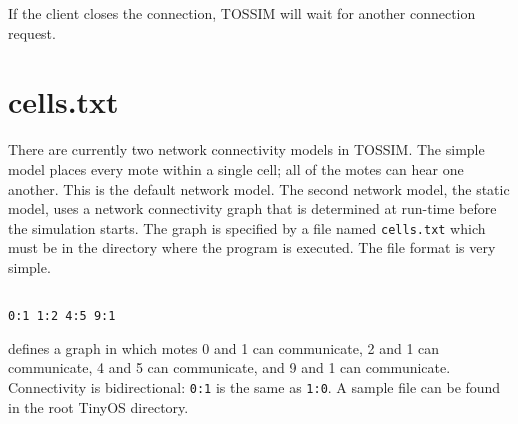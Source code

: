 \documentclass[12pt]{article}
\begin{document}
If the client closes the connection, TOSSIM will wait for another
connection request.

\section*{cells.txt}

There are currently two network connectivity models in TOSSIM. The simple model places every mote within a single cell; all of the motes can hear one another. This is the default network model. The second network model, the static model, uses a network connectivity graph that is determined at run-time before the simulation starts. The graph is specified by a file named {\tt cells.txt} which must be in the directory where the program is executed. The file format is very simple.

\begin{verbatim}

0:1 1:2 4:5 9:1

\end{verbatim}

defines a graph in which motes 0 and 1 can communicate, 2 and 1 can communicate, 4 and 5 can communicate, and 9 and 1 can communicate. Connectivity is bidirectional: {\tt 0:1} is the same as {\tt 1:0}. A sample file can be found in the root TinyOS directory.
\end{document}

